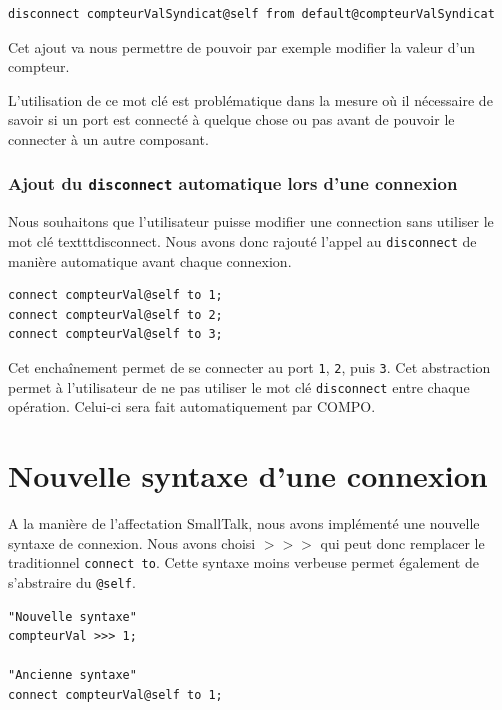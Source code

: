 \documentclass[11pt,a4paper,openany,oneside]{book}
\begin{document}
\begin{lstlisting}[language=Compo, frame=single, caption=Syntaxe d'une déconnexion]
disconnect compteurValSyndicat@self from default@compteurValSyndicat
\end{lstlisting}

Cet ajout va nous permettre de pouvoir par exemple modifier la valeur d'un compteur.

L'utilisation de ce mot clé est problématique dans la mesure où il nécessaire de savoir si un port est connecté à quelque chose ou pas avant de pouvoir le connecter à un autre composant. 

\subsubsection{Ajout du \texttt{disconnect} automatique lors d'une connexion}

Nous souhaitons que l'utilisateur puisse modifier une connection sans utiliser le mot clé texttt{disconnect}. Nous avons donc rajouté l'appel au \texttt{disconnect} de manière automatique avant chaque connexion.

\begin{lstlisting}[language=Compo, frame=single, caption=Syntaxe d'une connexion entre un port et un littéral]
connect compteurVal@self to 1;
connect compteurVal@self to 2;
connect compteurVal@self to 3;
\end{lstlisting}

Cet enchaînement permet de se connecter au port \texttt{1}, \texttt{2}, puis \texttt{3}. Cet abstraction permet à l'utilisateur de ne pas utiliser le mot clé \texttt{disconnect} entre chaque opération. Celui-ci sera fait automatiquement par COMPO. 

\section{Nouvelle syntaxe d'une connexion}

A la manière de l'affectation SmallTalk, nous avons implémenté une nouvelle syntaxe de connexion. Nous avons choisi $>>>$ qui peut donc remplacer le traditionnel \texttt{connect to}. Cette syntaxe moins verbeuse permet également de s'abstraire du \texttt{@self}.

\begin{lstlisting}[language=Compo, frame=single, caption=Comparaison entre l'ancienne et la nouvelle syntaxe d'une connexion]
"Nouvelle syntaxe"
compteurVal >>> 1;

"Ancienne syntaxe"
connect compteurVal@self to 1;
\end{lstlisting}
\end{document}
